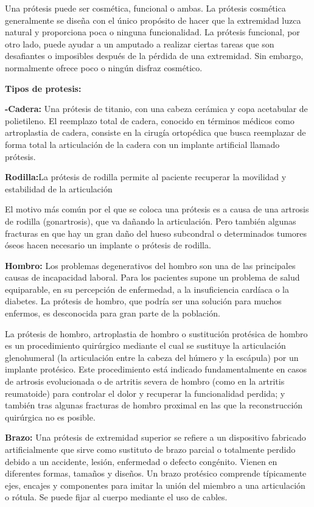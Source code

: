 \documentclass{article}
\begin{document}
Una prótesis puede ser cosmética, funcional o ambas. La prótesis cosmética generalmente se diseña con el único propósito de hacer que la extremidad luzca natural y proporciona poca o ninguna funcionalidad. La prótesis funcional, por otro lado, puede ayudar a un amputado a realizar ciertas tareas que son desafiantes o imposibles después de la pérdida de una extremidad. Sin embargo, normalmente ofrece poco o ningún disfraz cosmético.


\textbf{Tipos de protesis: } 

\textbf{-Cadera:} Una prótesis de titanio, con una cabeza cerámica y copa acetabular de polietileno. El reemplazo total de cadera, conocido en términos médicos como artroplastia de cadera, consiste en la cirugía ortopédica que busca reemplazar de forma total la articulación de la cadera con un implante artificial llamado prótesis.

\textbf{Rodilla:}La prótesis de rodilla permite al paciente recuperar la movilidad y estabilidad de la articulación

El motivo más común por el que se coloca una prótesis es a causa de una artrosis de rodilla (gonartrosis), que va dañando la articulación. Pero también algunas fracturas en que hay un gran daño del hueso subcondral o determinados tumores óseos hacen necesario un implante o prótesis de rodilla.

\textbf{Hombro:} Los problemas degenerativos del hombro son una de las principales causas de incapacidad laboral. Para los pacientes supone un problema de salud equiparable, en su percepción de enfermedad, a la insuficiencia cardíaca o la diabetes. La prótesis de hombro, que podría ser una solución para muchos enfermos, es desconocida para gran parte de la población.

La prótesis de hombro, artroplastia de hombro o sustitución protésica de hombro es un procedimiento quirúrgico mediante el cual se sustituye la articulación glenohumeral (la articulación entre la cabeza del húmero y la escápula) por un implante protésico. Este procedimiento está indicado fundamentalmente en casos de artrosis evolucionada o de artritis severa de hombro (como en la artritis reumatoide) para controlar el dolor y recuperar la funcionalidad perdida; y también tras algunas fracturas de hombro proximal en las que la reconstrucción quirúrgica no es posible.

\textbf{Brazo:} Una prótesis de extremidad superior se refiere a un dispositivo fabricado artificialmente que sirve como sustituto de brazo parcial o totalmente perdido debido a un accidente, lesión, enfermedad o defecto congénito. Vienen en diferentes formas, tamaños y diseños. Un brazo protésico comprende típicamente ejes, encajes y componentes para imitar la unión del miembro a una articulación o rótula. Se puede fijar al cuerpo mediante el uso de cables.
\end{document}
